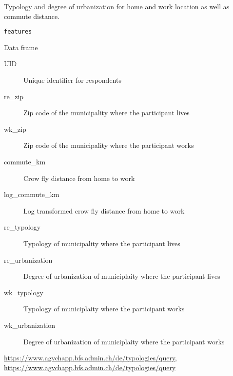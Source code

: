 %
\begin{Description}
Typology and degree of urbanization for home and work location as well as
commute distance.
\end{Description}
%
\begin{Usage}
\begin{verbatim}
features
\end{verbatim}
\end{Usage}
%
\begin{Format}
Data frame
\begin{description}

\item[UID] Unique identifier for respondents
\item[re\_zip] Zip code of the municipality where the participant lives
\item[wk\_zip] Zip code of the municipality where the participant works
\item[commute\_km] Crow fly distance from home to work
\item[log\_commute\_km] Log transformed crow fly distance from home to work
\item[re\_typology] Typology of municipality where the participant lives
\item[re\_urbanization] Degree of urbanization of municiplaity where the participant lives
\item[wk\_typology] Typology of municiplaity where the participant works
\item[wk\_urbanization] Degree of urbanization of municiplaity where the participant works

\end{description}

\end{Format}
%
\begin{SeeAlso}
\url{https://www.agvchapp.bfs.admin.ch/de/typologies/query}, \url{https://www.agvchapp.bfs.admin.ch/de/typologies/query}
\end{SeeAlso}


